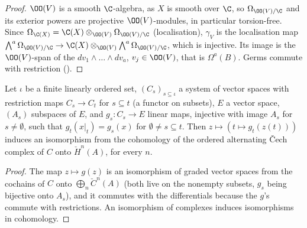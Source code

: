\begin{proof}
$\OO(V)$ is a smooth $\C$-algebra, as $X$ is smooth over $\C$, so $\Omega_{\OO(V)/\C}$ and its exterior powers are projective
$\OO(V)$-modules, in particular torsion-free. Since $\Omega_{\C(X)}=\C(X)\otimes_{\OO(V)}\Omega_{\OO(V)/\C}$ (localisation), $\gamma_V$ is the
localisation map $\bigwedge^a\Omega_{\OO(V)/\C}\to\C(X)\otimes_{\OO(V)}\bigwedge^a\Omega_{\OO(V)/\C}$, which is injective. Its image is the
$\OO(V)$-span of the $dv_1\wedge\dots\wedge dv_a$, $v_j\in\OO(V)$, that is $\Omega^a(B)$. Germs commute with restriction
().
\end{proof}

\begin{lemma}\label{pf:hlf-cech:cechiso}
Let $\iota$ be a finite linearly ordered set, $(C_s)_{s\subseteq\iota}$ a system of vector spaces with restriction maps $C_s\to C_t$ for $s\subseteq t$
(a functor on subsets), $E$ a vector space, $(A_s)$ subspaces of $E$, and $g_s\colon C_s\to E$ linear maps, injective with image $A_s$ for
$s\ne\emptyset$, such that $g_t(x|_t)=g_s(x)$ for $\emptyset\ne s\subseteq t$. Then $z\mapsto(t\mapsto g_t(z(t)))$ induces an isomorphism from the
cohomology of the ordered alternating \v{C}ech complex of $C$ onto $\check H^n(A)$, for every $n$.
\end{lemma}

\begin{proof}
The map $z\mapsto g(z)$ is an isomorphism of graded vector spaces from the cochains of $C$ onto $\bigoplus_n\check C^n(A)$ (both live on the
nonempty subsets, $g_s$ being bijective onto $A_s$), and it commutes with the differentials because the $g$'s commute with restrictions. An
isomorphism of complexes induces isomorphisms in cohomology.
\end{proof}

